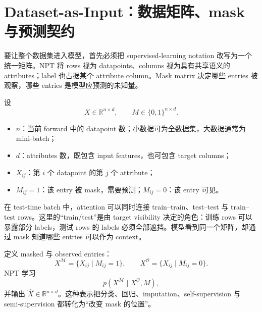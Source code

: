 \section{Dataset-as-Input：数据矩阵、mask 与预测契约}

要让整个数据集进入模型，首先必须把 supervised-learning notation 改写为一个统一矩阵。NPT 将 rows 视为 datapoints、columns 视为具有共享语义的 attributes；label 也占据某个 attribute column。Mask matrix 决定哪些 entries 被观察，哪些 entries 是模型应预测的未知量。


设
\[
X\in\mathbb{R}^{n\times d},\qquad M\in\{0,1\}^{n\times d}.
\]

\begin{itemize}
  \item $n$：当前 forward 中的 datapoint 数；小数据可为全数据集，大数据通常为 mini-batch；
  \item $d$：attributes 数，既包含 input features，也可包含 target columns；
  \item $X_{ij}$：第 $i$ 个 datapoint 的第 $j$ 个 attribute；
  \item $M_{ij}=1$：该 entry 被 mask，需要预测；$M_{ij}=0$：该 entry 可见。
\end{itemize}


在 test-time batch 中，attention 可以同时连接 train--train、test--test 与 train--test rows。这里的“train/test”是由 target visibility 决定的角色：训练 rows 可以暴露部分 labels，测试 rows 的 labels 必须全部遮挡。模型看到同一个矩阵，却通过 mask 知道哪些 entries 可以作为 context。


定义 masked 与 observed entries：
\[
X^{\mathcal{M}}=\{X_{ij}\mid M_{ij}=1\},\qquad
X^{\mathcal{O}}=\{X_{ij}\mid M_{ij}=0\}.
\]
NPT 学习
\[
p\!\left(X^{\mathcal{M}}\mid X^{\mathcal{O}},M\right),
\]
并输出 $\widehat X\in\mathbb{R}^{n\times d}$。这种表示把分类、回归、imputation、self-supervision 与 semi-supervision 都转化为“改变 mask 的位置”。

